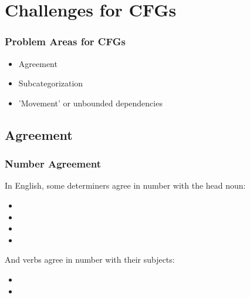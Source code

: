 


\section{Challenges for CFGs}

\begin{frame}[fragile]
\frametitle{Problem Areas for CFGs}

\begin{itemize}
\item Agreement
  
\item Subcategorization
  
\item 'Movement' or unbounded dependencies
\end{itemize}

\end{frame}


\subsection{Agreement}

\begin{frame}[fragile]
\frametitle{Number Agreement}

In English, some determiners agree in number with the head noun:
\begin{itemize}
\item {}
\item {}
\item \bad {}
\item \bad {}
\end{itemize}

And verbs agree in number with their subjects:
\begin{itemize}
\item {}
\item \bad {}
\end{itemize}
\end{frame}

